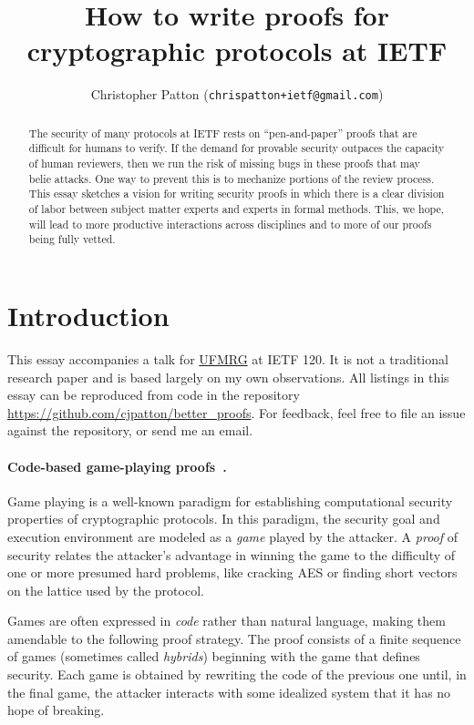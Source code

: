 \documentclass{article}
\title{How to write proofs for cryptographic protocols at IETF}
\author{Christopher Patton ({\texttt{\small chrispatton+ietf@gmail.com}})}
\begin{document}
\maketitle

\begin{abstract}

  The security of many protocols at IETF rests on ``pen-and-paper'' proofs that
  are difficult for humans to verify.
  If the demand for provable security outpaces the capacity of human reviewers,
  then we run the risk of missing bugs in these proofs that may belie attacks.
  One way to prevent this is to mechanize portions of the review process.
  This essay sketches a vision for writing security proofs in which there is a
  clear division of labor between subject matter experts and experts in formal
  methods.
  This, we hope, will lead to more productive interactions across disciplines
  and to more of our proofs being fully vetted.

\end{abstract}

\section{Introduction}\label{sec/intro}

This essay accompanies a talk for
\href{https://datatracker.ietf.org/group/ufmrg/about/}{UFMRG} at IETF 120.
%
It is not a traditional research paper and is based largely on my own
observations.
%
All listings in this essay can be reproduced from code in the repository
\url{https://github.com/cjpatton/better_proofs}.
%
For feedback, feel free to file an issue against the repository, or send me an
email.


\paragraph{Code-based game-playing proofs~\cite{BR06}.}
%
Game playing is a well-known paradigm for establishing computational security
properties of cryptographic protocols.
%
In this paradigm, the security goal and execution environment are modeled as a
\emph{game} played by the attacker. A \emph{proof} of security relates the
attacker's advantage in winning the game to the difficulty of one or more
presumed hard problems, like cracking AES or finding short vectors on the
lattice used by the protocol.

Games are often expressed in \emph{code} rather than natural language, making
them amendable to the following proof strategy.
%
The proof consists of a finite sequence of games (sometimes called
\emph{hybrids}) beginning with the game that defines security.
%
Each game is obtained by rewriting the code of the previous one until, in the
final game, the attacker interacts with some idealized system that it has no
hope of breaking.
\end{document}
